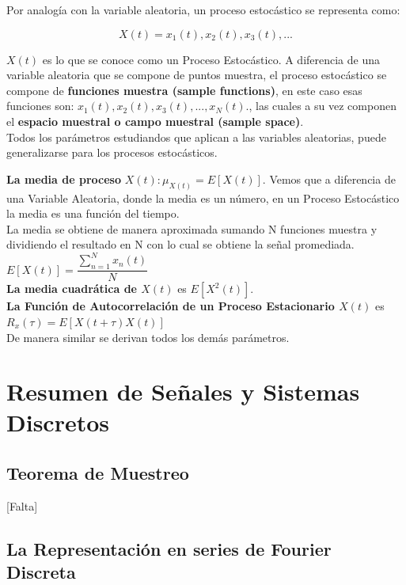 Por analogía con la variable aleatoria, un proceso estocástico se representa como:

\begin{equation} \label{capuno_variablecuatro}	
X(t) = {x_{1}(t), x_{2}(t), x_{3}(t),...} 
\end{equation}

$X(t)$ es lo que se conoce como un Proceso Estocástico. A diferencia de una variable aleatoria que se compone de puntos muestra, el proceso estocástico se compone de \textbf{funciones muestra (sample functions)}, en este caso esas funciones son: $x_{1}(t), x_{2}(t), x_{3}(t), ..., x_{N}(t)$., las cuales a su vez componen el \textbf{espacio muestral o campo muestral (sample space)}.\\
Todos los parámetros estudiandos que aplican a las variables aleatorias, puede generalizarse para los procesos estocásticos.

\textbf{La media de proceso} $X(t): \mu _{X(t)}=E[X(t)]$. Vemos que a diferencia de una Variable Aleatoria, donde la media es un número, en un Proceso Estocástico la media es una función del tiempo. \\

La media se obtiene de manera aproximada sumando N funciones muestra y dividiendo el resultado en N con lo cual se obtiene la señal promediada. $E[X(t)]= \dfrac{\sum_{n=1}^{N}x_{n}(t)}{N}$ \\

\textbf{La media cuadrática de $X(t)$} es  $E[X^{2}(t)]$.\\
\textbf{La Función de Autocorrelación de un Proceso Estacionario $X(t) $ } es $R_{x}( \tau )=E[X(t+ \tau )X(t)]$ \\
De manera similar se derivan todos los demás parámetros.

\section{Resumen de Señales y Sistemas Discretos}

\subsection{Teorema de Muestreo}
[Falta]

\subsection{La Representación en series de Fourier Discreta}

